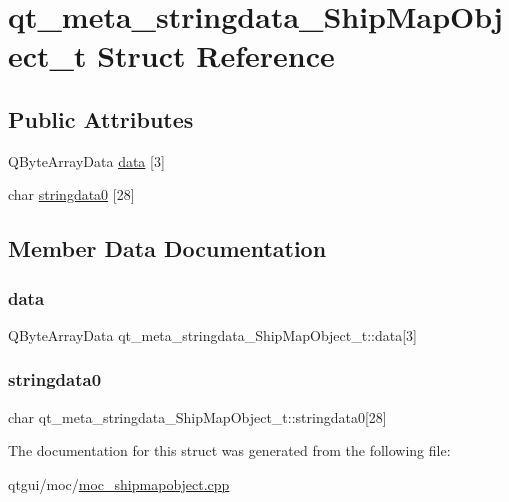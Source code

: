 \hypertarget{structqt__meta__stringdata___ship_map_object__t}{}\section{qt\+\_\+meta\+\_\+stringdata\+\_\+\+Ship\+Map\+Object\+\_\+t Struct Reference}
\label{structqt__meta__stringdata___ship_map_object__t}
\subsection*{Public Attributes}
\begin{DoxyCompactItemize}
\item 
Q\+Byte\+Array\+Data \mbox{\hyperlink{structqt__meta__stringdata___ship_map_object__t_a15ca3428440a59d16a7b3b902541b49f}{data}} \mbox{[}3\mbox{]}
\item 
char \mbox{\hyperlink{structqt__meta__stringdata___ship_map_object__t_a2773543d6cce115ec77165da97832d9c}{stringdata0}} \mbox{[}28\mbox{]}
\end{DoxyCompactItemize}


\subsection{Member Data Documentation}
\mbox{\label{structqt__meta__stringdata___ship_map_object__t_a15ca3428440a59d16a7b3b902541b49f}} 
\subsubsection{\texorpdfstring{data}{data}}
{\footnotesize\ttfamily Q\+Byte\+Array\+Data qt\+\_\+meta\+\_\+stringdata\+\_\+\+Ship\+Map\+Object\+\_\+t\+::data\mbox{[}3\mbox{]}}

\mbox{\label{structqt__meta__stringdata___ship_map_object__t_a2773543d6cce115ec77165da97832d9c}} 
\subsubsection{\texorpdfstring{stringdata0}{stringdata0}}
{\footnotesize\ttfamily char qt\+\_\+meta\+\_\+stringdata\+\_\+\+Ship\+Map\+Object\+\_\+t\+::stringdata0\mbox{[}28\mbox{]}}



The documentation for this struct was generated from the following file\+:\begin{DoxyCompactItemize}
\item 
qtgui/moc/\mbox{\hyperlink{moc__shipmapobject_8cpp}{moc\+\_\+shipmapobject.\+cpp}}\end{DoxyCompactItemize}

